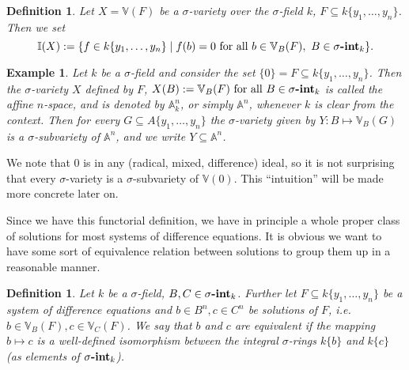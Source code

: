 \documentclass{article}
\def\I{\mathbb{I}}
\def\VV{\mathbb{V}}
\def\s{\sigma}
\def\fa{\text{ for all }}
\newcommand{\catname}[1]{{\normalfont\textbf{#1}}}
\newcommand{\sintk}{\s\text{\catname{-int}}_k}
\theoremstyle{plain}
\newtheorem{ex}[Satz]{Example}
\newtheorem{lem}[Satz]{Lemma}
\newtheorem{defn}[Satz]{Definition}
\theoremstyle{definition}
\begin{document}
\begin{defn}\label{defnI}
Let $X = \VV(F)$ be a $\s$-variety over the $\s$-field $k$, $F \subseteq k\{y_1,\ldots,y_n\}$. Then we set $$\I(X):= \{ f \in k\{y_1,\ldots,y_n\} \mid f(b) = 0 \fa b \in \VV_B(F), ~ B \in \sintk \}.$$ \index{ $\I(X)$}
\end{defn}

\begin{ex}\label{A^n}
Let $k$ be a $\s$-field and consider the set $\{ 0 \} = F \subseteq k\{y_1,\ldots,y_n\}$. Then the $\s$-variety $X$ defined by $F$, $X(B) := \VV_B(F) \fa B \in \sintk$ is called the affine $n$-space, and is denoted by $\mathbb{A}^n_k$, 
or simply $\mathbb{A}^n$, whenever $k$ is clear from the context. Then for every $G \subseteq A\{y_1,\ldots,y_n\}$ the $\s$-variety given by $Y: B \mapsto \VV_B(G)$ is a $\s$-subvariety of $\mathbb{A}^n$, 
and we write $Y \subseteq \mathbb{A}^n$.
\end{ex}

We note that $0$ is in any (radical, mixed, difference) ideal, so it is not surprising that every $\s$-variety is a $\s$-subvariety of $\VV(0)$. This ``intuition'' will be made more concrete later on.

Since we have this functorial definition, we have in principle a whole proper class of solutions for most systems of difference equations. 
It is obvious we want to have some sort of equivalence relation between solutions to group them up in a reasonable manner.

\begin{defn}\label{equivsols}
Let $k$ be a $\s$-field, $B,C \in \sintk$. Further let $F \subseteq k\{y_1,\ldots,y_n\}$ be a system of difference equations and $b \in B^n, c \in C^n$ be solutions of $F$, i.e. $b \in \VV_B(F), c \in \VV_C(F)$.
We say that $b$ and $c$ are equivalent if the mapping $b \mapsto c$ is a well-defined isomorphism between the integral $\s$-rings $k\{b\}$ and $k\{c\}$  (as elements of $\sintk$). 
\end{defn}

\end{document}
